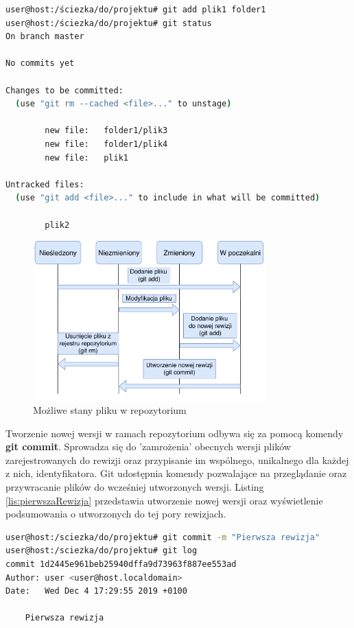 \begin{lstlisting}[language=bash,caption={Dodawanie elementów do poczekalni}]
user@host:/ściezka/do/projektu# git add plik1 folder1
user@host:/ściezka/do/projektu# git status
On branch master

No commits yet

Changes to be committed:
  (use "git rm --cached <file>..." to unstage)

        new file:   folder1/plik3
        new file:   folder1/plik4
        new file:   plik1

Untracked files:
  (use "git add <file>..." to include in what will be committed)

        plik2
\end{lstlisting}

\begin{figure}[H]
\centering
\includegraphics[width=0.8\textwidth]{res/fileStates.pdf}
\caption{Możliwe stany pliku w repozytorium \cite{GitChart}} 
\end{figure}

Tworzenie nowej wersji w ramach repozytorium odbywa się za pomocą komendy \textbf{git commit}. Sprowadza się do 'zamrożenia' obecnych wersji plików zarejestrowanych do rewizji oraz przypisanie im wspólnego, unikalnego dla każdej z nich, identyfikatora. Git udostępnia komendy pozwalające na przeglądanie oraz przywracanie plików do wcześniej utworzonych wersji. Listing \ref{lis:pierwszaRewizja} przedstawia utworzenie nowej wersji oraz wyświetlenie podsumowania o utworzonych do tej pory rewizjach.

\begin{lstlisting}[label={lis:pierwszaRewizja}, language=bash,caption={Utworzenie nowej rewizji}]
user@host:/sciezka/do/projektu# git commit -m "Pierwsza rewizja"
user@host:/sciezka/do/projektu# git log 
commit 1d2445e961beb25940dffa9d73963f887ee553ad
Author: user <user@host.localdomain>
Date:   Wed Dec 4 17:29:55 2019 +0100

    Pierwsza rewizja
\end{lstlisting}

